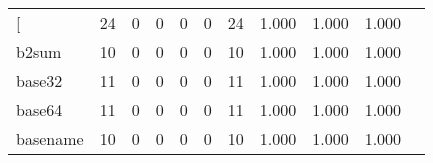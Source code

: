 \begin{longtable}{lp{1.2cm}p{1.2cm}p{1.2cm}p{1.2cm}p{1.2cm}p{1.2cm}p{1.2cm}p{1.2cm}p{1.2cm}p{1.2cm}}
\bottomrule
\endlastfoot
{[}         &                                    24 &                                                  0 &                                                  0 &                                                  0 &                                                  0 &                                                 24 &                                              1.000 &                                              1.000 &                                              1.000 \\
b2sum     &                                    10 &                                                  0 &                                                  0 &                                                  0 &                                                  0 &                                                 10 &                                              1.000 &                                              1.000 &                                              1.000 \\
base32    &                                    11 &                                                  0 &                                                  0 &                                                  0 &                                                  0 &                                                 11 &                                              1.000 &                                              1.000 &                                              1.000 \\
base64    &                                    11 &                                                  0 &                                                  0 &                                                  0 &                                                  0 &                                                 11 &                                              1.000 &                                              1.000 &                                              1.000 \\
basename  &                                    10 &                                                  0 &                                                  0 &                                                  0 &                                                  0 &                                                 10 &                                              1.000 &                                              1.000 &                                              1.000 \\

\end{longtable}
